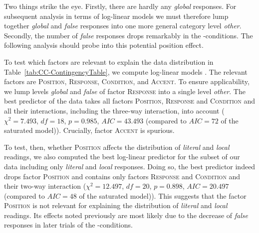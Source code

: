 \documentclass[fleqn,reqno,10pt]{article}
\renewcommand{\es}{\acro{es}}
\begin{document}
Two things strike the eye. Firstly, there are hardly any \emph{global}
responses. For subsequent analysis in terms of log-linear models we
must therefore lump together \emph{global} and \emph{false} responses
into one more general category level \emph{other}. Secondly, the
number of \emph{false} responses drops remarkably in the
\es-conditions. The following analysis should probe into this
potential position effect.


To test which factors are relevant to explain the data distribution in
Table~\ref{tab:CC-ContingencyTable}, we compute log-linear models
\citep{KnokeBurke1980:Log-Linear-Mode}. The relevant factors are
\textsc{Position}, \textsc{Response}, \textsc{Condition}, and
\textsc{Accent}. To ensure applicability, we lump levels \emph{global}
and \emph{false} of factor \textsc{Response} into a single level
\emph{other}. The best predictor of the data takes all factors
\textsc{Position}, \textsc{Response} and \textsc{Condition} and all
their interactions, including the three-way interaction, into account
($\chi^2 = 7.493$, $df=18$, $p = 0.985$, $AIC = 43.493$ (compared to
$AIC=72$ of the saturated model)). Crucially, factor \textsc{Accent}
is spurious.


To test, then, whether \textsc{Position} affects the distribution of
\emph{literal} and \emph{local} readings, we also computed the best
log-linear predictor for the subset of our data including only
\emph{literal} and \emph{local} responses. Doing so, the best
predictor indeed drops factor \textsc{Position} and contains only
factors \textsc{Response} and \textsc{Condition} and their two-way
interaction ($\chi^2 = 12.497$, $df=20$, $p = 0.898$, $AIC = 20.497$
(compared to $AIC=48$ of the saturated model)). This suggests that the
factor \textsc{Position} is not relevant for explaining the
distribution of \emph{literal} and \emph{local} readings. Its effects
noted previously are most likely due to the decrease of \emph{false}
responses in later trials of the \es-conditions.
\end{document}
